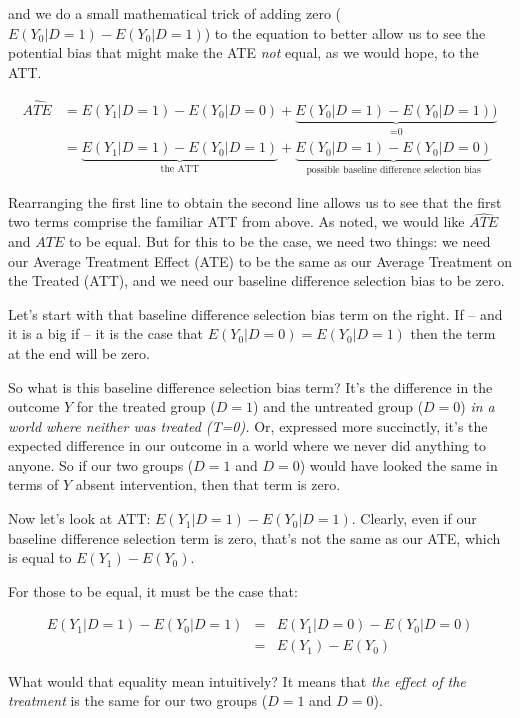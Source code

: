 \documentclass[11pt]{article}
\begin{document}
and we do a small mathematical trick of adding zero ($E(Y_{0}|D=1) - E(Y_{0}|D=1)$) to the equation to better allow us to see the potential bias that might make the ATE \emph{not} equal, as we would hope, to the ATT.

\begin{align*}
      \widehat{ATE }&=  E(Y_{1}|D=1) - E(Y_{0}|D=0) + \underbrace{E(Y_{0}|D=1) - E(Y_{0}|D=1))}_\text{=0} \\
        &= \underbrace{E(Y_{1}|D=1) - E(Y_{0}|D=1)}_\text{the ATT} + \underbrace{E(Y_{0}|D=1) - E(Y_{0}|D=0) }_\text{possible baseline difference selection bias}
\end{align*}

Rearranging the first line to obtain the second line allows us to see that the first two terms comprise the familiar ATT from above.  As noted, we would like $\widehat{ATE}$ and $ATE$ to be equal. But for this to be the case, we need two things: we need our Average Treatment Effect (ATE) to be the same as our Average Treatment on the Treated (ATT), and we need our baseline difference selection bias to be zero.


Let's start with that baseline difference selection bias term on the right. If -- and it is a big if -- it is the case that $E(Y_{0}|D=0) = E(Y_{0}|D=1)$ then the term at the end will be zero.

So what is this baseline difference selection bias term? It's the difference in the outcome $Y$ for the treated group ($D=1$) and the untreated group ($D=0$) \emph{in a world where neither was treated (T=0).} Or, expressed more succinctly, it's the expected difference in our outcome in a world where we never did anything to anyone. So if our two groups ($D=1$ and $D=0$) would have looked the same in terms of $Y$ absent intervention, then that term is zero.

Now let's look at ATT: $E(Y_{1}|D=1) - E(Y_{0}|D=1)$. Clearly, even if our baseline difference selection term is zero, that's not the same as our ATE, which is equal to $E(Y_{1}) - E(Y_{0})$.

For those to be equal, it must be the case that:

\begin{eqnarray}
E(Y_{1}|D=1) - E(Y_{0}|D=1) &=& E(Y_{1}|D=0) - E(Y_{0}|D=0) \nonumber\\
 &=& E(Y_{1}) - E(Y_{0}) \nonumber
\end{eqnarray}

What would that equality mean intuitively? It means that \emph{the effect of the treatment} is the same for our two groups ($D=1$ and $D=0$).
\end{document}
